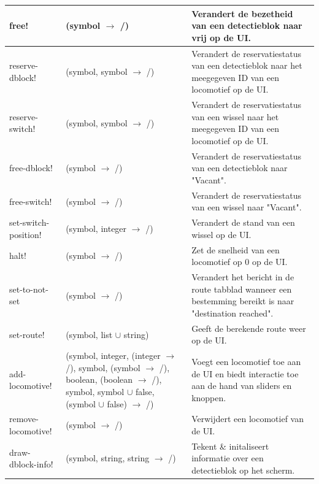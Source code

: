 \documentclass{article}
\begin{document}
\begin{table}[h!]
        \centering
        \begin{tabular}{|p{2.9cm}|p{4cm}|p{6.1cm}|}
                \hline
                free! & (symbol $\rightarrow$ /)  & Verandert de bezetheid van een detectieblok naar vrij op de UI.\\
                \hline
                reserve-dblock! & (symbol, symbol $\rightarrow$ /) & Verandert de reservatiestatus van een detectieblok naar het meegegeven ID van een locomotief op de UI.\\
                \hline
                reserve-switch! & (symbol, symbol $\rightarrow$ /) & Verandert de reservatiestatus van een wissel naar het meegegeven ID van een locomotief op de UI.\\
                \hline
                free-dblock! & (symbol $\rightarrow$ /) & Verandert de reservatiestatus van een detectieblok naar "Vacant".\\
                \hline
                free-switch! & (symbol $\rightarrow$ /) & Verandert de reservatiestatus van een wissel naar "Vacant".\\ 
                \hline
                set-switch-position! & (symbol, integer $\rightarrow$ /) & Verandert de stand van een wissel op de UI.\\
                \hline
                halt! & (symbol $\rightarrow$ /) & Zet de snelheid van een locomotief op 0 op de UI.\\
                \hline
                set-to-not-set & (symbol $\rightarrow$ /) & Verandert het bericht in de route tabblad wanneer een bestemming bereikt is naar "destination reached".\\
                \hline
                set-route! & (symbol, list $\cup$ string) & Geeft de berekende route weer op de UI.\\
                \hline
                add-locomotive! & (symbol, integer, (integer $\rightarrow$ /), symbol, (symbol $\rightarrow$ /),
                boolean, (boolean $\rightarrow$ /), symbol, symbol $\cup$ false, (symbol $\cup$ false) $\rightarrow$ /) & Voegt een locomotief toe aan de UI en biedt interactie toe aan de hand van sliders en knoppen.\\
                \hline
                remove-locomotive! & (symbol $\rightarrow$ /) & Verwijdert een locomotief van de UI.\\
                \hline
                draw-dblock-info! & (symbol, string, string $\rightarrow$ /) & Tekent \& initaliseert informatie over een detectieblok op het scherm. \\

\end{tabular}
\end{table}
\end{document}
